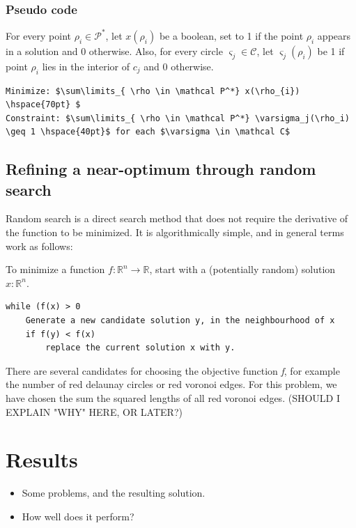\documentclass[a4paper,12pt]{article}
\begin{document}
\subsubsection{Pseudo code }
For every point $\rho_i \in \mathcal P^*$, let $x(\rho_i)$ be a boolean, set to 1 if the point $\rho_i$ appears in a solution and 0 otherwise. Also, for every circle $\varsigma_j \in \mathcal C$, let $\varsigma_j (\rho_i)$ be 1 if point $\rho_i$ lies in the interior of $c_j$ and 0 otherwise.



\begin{lstlisting}[mathescape]
Minimize: $\sum\limits_{ \rho \in \mathcal P^*} x(\rho_{i}) \hspace{70pt} $
Constraint: $\sum\limits_{ \rho \in \mathcal P^*} \varsigma_j(\rho_i) \geq 1 \hspace{40pt}$ for each $\varsigma \in \mathcal C$
\end{lstlisting}

\subsection{Refining a near-optimum through random search}
\label{sec:rand}
Random search is a direct search method that does not require the derivative of the function to be minimized. It is algorithmically simple, and in general terms work as follows:

To minimize a function $f : \mathds{R}^n \rightarrow \mathds{R}$, start with a (potentially random)  solution $x :  \mathds{R}^n$. 

\begin{lstlisting}[mathescape]
while (f(x) > 0
	Generate a new candidate solution y, in the neighbourhood of x
	if f(y) < f(x)
		replace the current solution x with y.
\end{lstlisting}

There are several candidates for choosing the objective function \emph{f}, for example the number of red delaunay circles or red voronoi edges. For this problem, we have chosen the sum the squared lengths of all red voronoi edges. (SHOULD I EXPLAIN "WHY" HERE, OR LATER?)

\section{Results}
\begin{itemize}
\item
Some problems, and the resulting solution.
\item
How well does it perform?
\end{itemize}
\end{document}
